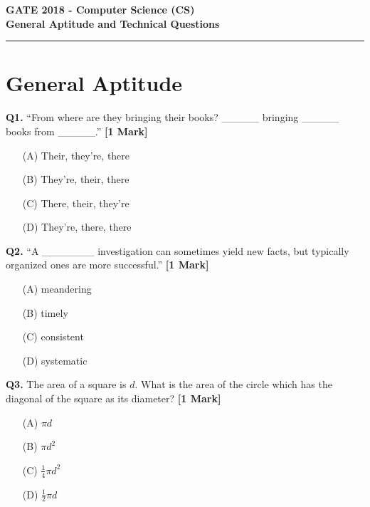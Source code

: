 \documentclass[11pt]{article}
\newcommand{\questiona}[2]{
    \noindent\textbf{Q#2.} #1 \hfill \textbf{[1 Mark]}
}
\begin{document}
\begin{center}
    \Large\textbf{GATE 2018 - Computer Science (CS)} \\
    \large\textbf{General Aptitude and Technical Questions} \\
    \rule{\textwidth}{0.5pt}
\end{center}

\vspace{0.5cm}

\section*{General Aptitude}

\questiona{“From where are they bringing their books? \_\_\_\_\_ bringing \_\_\_\_\_ books from \_\_\_\_\_.”}{1}
\begin{enumerate}
    \item[(A)] Their, they’re, there
    \item[(B)] They’re, their, there
    \item[(C)] There, their, they’re
    \item[(D)] They’re, there, there
\end{enumerate}
\vspace{0.5cm}

\questiona{“A \_\_\_\_\_\_\_ investigation can sometimes yield new facts, but typically organized ones are more successful.”}{2}
\begin{enumerate}
    \item[(A)] meandering
    \item[(B)] timely
    \item[(C)] consistent
    \item[(D)] systematic
\end{enumerate}
\vspace{0.5cm}

\questiona{The area of a square is \( d \). What is the area of the circle which has the diagonal of the square as its diameter?}{3}
\begin{enumerate}
    \item[(A)] \( \pi d \)
    \item[(B)] \( \pi d^2 \)
    \item[(C)] \( \frac{1}{4}\pi d^2 \)
    \item[(D)] \( \frac{1}{2}\pi d \)
\end{enumerate}
\vspace{0.5cm}
\end{document}
